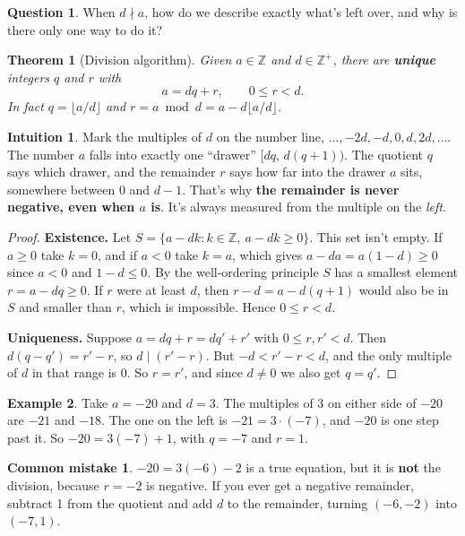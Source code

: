 \documentclass[11pt,a4paper]{article}
\newtheorem{theorem}{Theorem}[section]
\theoremstyle{definition}
\newtheorem{example}[theorem]{Example}
\newcommand{\Z}{\mathbb{Z}}
\theoremstyle{noteit}
\newtheorem*{question}{Question}
\theoremstyle{note}
\newtheorem*{intuition}{Intuition}
\newtheorem*{mistakeX}{Common mistake}
\newenvironment{mistake}{\begin{mistakeX}\leavevmode\marginpar{\raggedleft\vspace*{-0.9\baselineskip}\dbend}\ignorespaces}{\end{mistakeX}}
\begin{document}
\begin{question}
When $d\nmid a$, how do we describe exactly what's left over, and why is there only one way to do it?
\end{question}

\begin{theorem}[Division algorithm]
Given $a\in\Z$ and $d\in\Z^{+}$, there are \textbf{unique} integers $q$ and $r$ with
\[ a=dq+r,\qquad 0\le r<d. \]
In fact $q=\lfloor a/d\rfloor$ and $r=a\bmod d=a-d\lfloor a/d\rfloor$.
\end{theorem}

\begin{intuition}
Mark the multiples of $d$ on the number line, $\dots,-2d,-d,0,d,2d,\dots$. The number $a$ falls into exactly one ``drawer'' $[dq,\,d(q+1))$. The quotient $q$ says which drawer, and the remainder $r$ says how far into the drawer $a$ sits, somewhere between $0$ and $d-1$. That's why \textbf{the remainder is never negative, even when $a$ is}. It's always measured from the multiple on the \emph{left}.
\end{intuition}

\begin{proof}
\textbf{Existence.} Let $S=\{a-dk : k\in\Z,\ a-dk\ge 0\}$. This set isn't empty. If $a\ge 0$ take $k=0$, and if $a<0$ take $k=a$, which gives $a-da=a(1-d)\ge 0$ since $a<0$ and $1-d\le 0$. By the well-ordering principle $S$ has a smallest element $r=a-dq\ge 0$. If $r$ were at least $d$, then $r-d=a-d(q+1)$ would also be in $S$ and smaller than $r$, which is impossible. Hence $0\le r<d$.

\textbf{Uniqueness.} Suppose $a=dq+r=dq'+r'$ with $0\le r,r'<d$. Then $d(q-q')=r'-r$, so $d\mid(r'-r)$. But $-d<r'-r<d$, and the only multiple of $d$ in that range is $0$. So $r=r'$, and since $d\ne0$ we also get $q=q'$.
\end{proof}

\begin{example}
Take $a=-20$ and $d=3$. The multiples of 3 on either side of $-20$ are $-21$ and $-18$. The one on the left is $-21=3\cdot(-7)$, and $-20$ is one step past it. So $-20=3(-7)+1$, with $q=-7$ and $r=1$.
\end{example}

\begin{mistake}
$-20=3(-6)-2$ is a true equation, but it is \textbf{not} the division, because $r=-2$ is negative. If you ever get a negative remainder, subtract 1 from the quotient and add $d$ to the remainder, turning $(-6,-2)$ into $(-7,1)$.
\end{mistake}
\end{document}

